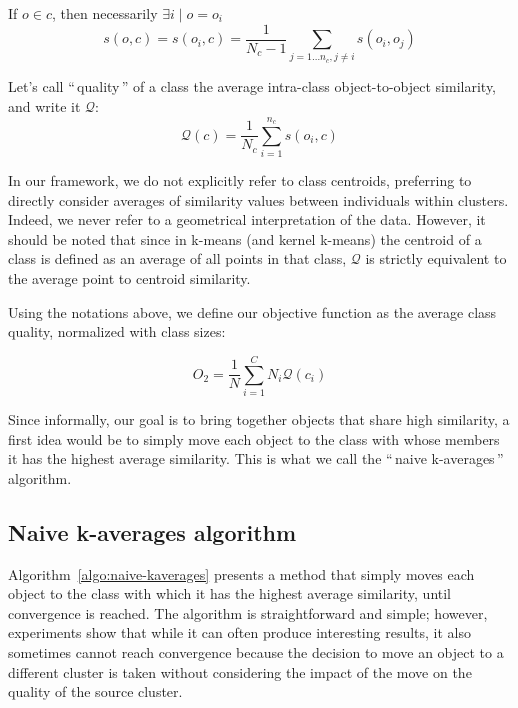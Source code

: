 \documentclass[a4paper,twoside]{article}
\newcommand{\gl}[1]{``\,#1\,''} %
\begin{document}
If $o \in c$, then necessarily $\exists i \mid o = o_i$
\begin{equation}
  s\left(o,c\right) = s\left(o_i, c\right) = \frac{1}{N_c-1} \sum_{j=1 \ldots n_c, j \neq i} s\left(o_i, o_j\right)
  	 \label{eq:soc_inclass}
\end{equation}

Let's call \gl{quality} of a class the average intra-class object-to-object similarity, and write it $\mathcal{Q}$:
\begin{equation}
\mathcal{Q}\left(c\right) = \frac{1}{N_c} \sum_{i=1}^{n_c} s\left(o_i, c\right)
\end{equation}

In our framework, we do not explicitly refer to class centroids, preferring to directly consider averages of similarity values between individuals within clusters. Indeed, we never refer to a geometrical interpretation of the data. However, it should be noted that since in k-means (and kernel k-means) the centroid of a class is defined as an average of all points in that class, $\mathcal{Q}$ is strictly equivalent to the average point to centroid similarity.

Using the notations above, we define our objective function as the average class quality, %
normalized with class sizes:

\[
O_2 = \frac{1}{N} \sum_{i=1}^{C} N_i \mathcal{Q}(c_i)
\]

Since informally, our goal is to bring together objects that share high similarity, a first idea would be to simply move each object to the class with whose members it has the highest average similarity. This is what we call the \gl{naive k-averages} algorithm.

\subsection{Naive k-averages algorithm}

Algorithm~\ref{algo:naive-kaverages} presents a method that simply moves each object to the class with which it has the highest average similarity, until convergence is reached. The algorithm is straightforward and simple; however, experiments show that while it can often produce interesting results, it also sometimes cannot reach convergence because the decision to move an object to a different cluster is taken without considering the impact of the move on the quality of the source cluster.
\end{document}
